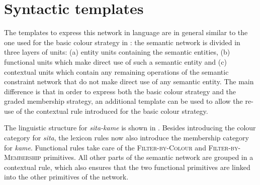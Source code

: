 \section{Syntactic templates}
\label{s:gms-syntactic-templates}

The templates to express this network in language are in general
similar to the one used for the basic colour strategy in
: the semantic network is
divided in three layers of units: (a) entity units containing the
semantic entities, (b) functional units which make direct use of such
a semantic entity and (c) contextual units which contain any remaining
operations of the semantic constraint network that do not make direct
use of any semantic entity. The main difference is that in order to
express both the basic colour strategy and the graded
  membership strategy, an additional template can be used to allow
the re-use of the contextual rule introduced for the basic colour
strategy.

The linguistic structure for \textit{sita-kame} is shown in . Besides introducing the colour
category for \textit{sita}, the lexicon rules now also introduce the
membership category for \textit{kame}. Functional rules take care of the
\textsc{Filter-by-Colour} and \textsc{Filter-by-Membership}
primitives. All other parts of the semantic network are grouped in a
contextual rule, which also ensures that the two functional primitives are
linked into the other primitives of the network.

